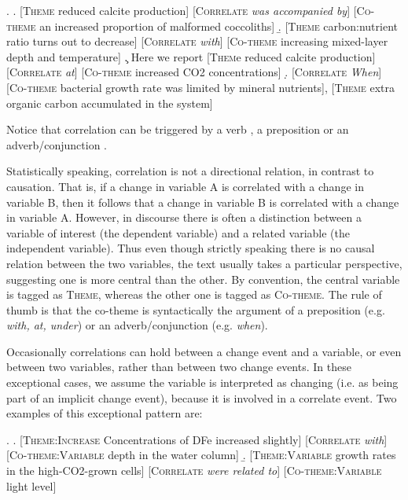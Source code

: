 \documentclass[10pt, a4paper]{article}
\newcommand{\tag}[1]{\textsc{#1}}
\begin{document}
\exi.
  \a. [\tag{Theme} reduced calcite production] [\tag{Correlate} \emph{was accompanied by}] [\tag{Co-theme} an increased proportion of malformed coccoliths]
  \b. [\tag{Theme} carbon:nutrient ratio turns out to decrease] [\tag{Correlate}  \emph{with}] [\tag{Co-theme} increasing mixed-layer depth and temperature]
  \c. Here we report [\tag{Them}e reduced calcite production] [\tag{Correlate}  \emph{at}] [\tag{Co-theme} increased CO2 concentrations]
  \d. [\tag{Correlate} \emph{When}] [\tag{Co-theme} bacterial growth rate was limited by mineral nutrients], [\tag{Theme} extra organic carbon accumulated in the system]

Notice that correlation can be triggered by a verb \Last[a], a preposition \Last[b-c] or an adverb/conjunction \Last[d].

Statistically speaking, correlation is not a directional relation, in contrast to causation. That is, if a change in variable A is correlated with a change in variable B, then it follows that a change in variable B is correlated with a change in variable A. However, in discourse there is often a distinction between a variable of interest (the dependent variable) and a related variable (the independent variable). 
Thus even though strictly speaking there is no causal relation between the two variables, the text usually takes a particular perspective, suggesting one is more central than the other. 
By convention, the central variable is tagged as \tag{Theme}, whereas the other one is tagged as \tag{Co-theme}. 
The rule of thumb is that the co-theme is syntactically the argument of a preposition (e.g. \emph{with, at, under}) or an adverb/conjunction (e.g. \emph{when}).  

Occasionally correlations can hold between a change event and a variable, or even between two variables, rather than between two change events.
In these exceptional cases, we assume the variable is interpreted as changing (i.e. as being part of an implicit change event), because it is involved in a correlate event.
Two examples of this exceptional pattern are: 

\exi.
  \a. [\tag{Theme:Increase} Concentrations of DFe increased slightly] [\tag{Correlate} \emph{with}]  [\tag{Co-theme:Variable} depth in the water column]
  \b. [\tag{Theme:Variable} growth rates in the high-CO2-grown cells] [\tag{Correlate} \emph{were related to}] [\tag{Co-theme:Variable} light level]
\end{document}
